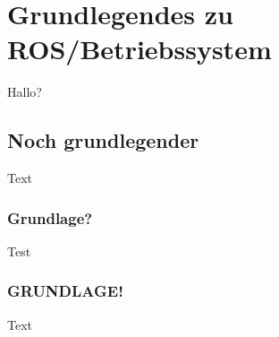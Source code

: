 \section{Grundlegendes zu ROS/Betriebssystem}
\label{sec:grundlegendesROS-OS}

Hallo?

\subsection{Noch grundlegender}
Text

\subsubsection{Grundlage?}
Test

\subsubsection{GRUNDLAGE!}
Text